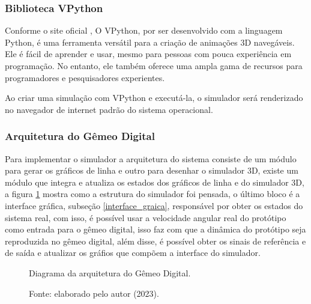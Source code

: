 \newpage
\subsubsection{Biblioteca VPython}

Conforme o site oficial \cite{vpython}, O VPython, por ser desenvolvido com a linguagem Python, é uma ferramenta versátil para a criação de animações 3D navegáveis. Ele é fácil de aprender e usar, mesmo para pessoas com pouca experiência em programação. No entanto, ele também oferece uma ampla gama de recursos para programadores e pesquisadores experientes.

Ao criar uma simulação com VPython e executá-la, o simulador será renderizado no navegador de internet padrão do sistema operacional.


\subsubsection{Arquitetura do Gêmeo Digital}

Para implementar o simulador a arquitetura do sistema consiste de um módulo para gerar os gráficos de linha e outro para desenhar o simulador 3D, existe um módulo que integra e atualiza os estados dos gráficos de linha e do simulador 3D, a figura \ref{fig3:image_13} mostra como a estrutura do simulador foi pensada, o último bloco é a interface gráfica, subseção \ref{interface_graica}, responsável por obter os estados do sistema real, com isso, é possível usar a velocidade angular real do protótipo como entrada para o gêmeo digital, isso faz com que a dinâmica do protótipo seja reproduzida no gêmeo digital, além disse, é possível obter os sinais de referência e de saída e atualizar os gráfios que compõem a interface do simulador.

\begin{figure}[!h]
	\centering
	\caption{Diagrama da arquitetura do Gêmeo Digital.}
        \vspace{0.2cm}
	\caption*{Fonte: elaborado pelo autor (2023).}
	\label{fig3:image_13}
\end{figure}


